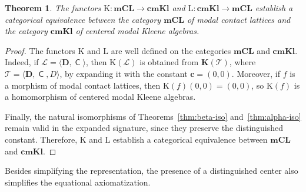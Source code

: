 \documentclass[10pt,a4paper]{amsart}
\newtheorem{theorem}{Theorem}[section]
\DeclareMathOperator{\con}{\mathsf{C}}
\newcommand{\cbf}{\mathbf{c}}
\newcommand{\D}{\mathbf{D}}
\begin{document}
\begin{theorem}
    The functors $\mathrm{K}:\mathbf{mCL}\longrightarrow\mathbf{cmKl}$ and $\mathrm{L}:\mathbf{cmKl}\longrightarrow\mathbf{mCL}$ establish a categorical equivalence between the category $\mathbf{mCL}$ of modal contact lattices and the category $\mathbf{cmKl}$ of centered modal Kleene algebras.
\end{theorem}
\begin{proof}
The functors $\mathrm{K}$ and $\mathrm{L}$ are well defined on the categories
$\mathbf{mCL}$ and $\mathbf{cmKl}$. Indeed, if
$\mathcal{L}=\langle\D,\con\rangle$, then
$\mathrm{K}(\mathcal{L})$ is obtained from
$\mathbf{K}(\mathcal{T})$, where
$\mathcal{T}=\langle\D,\con,D\rangle$, by expanding it with the constant
$\cbf=(0,0)$. Moreover, if $f$ is a morphism of modal contact lattices, then
$\mathrm{K}(f)(0,0)=(0,0)$,
so $\mathrm{K}(f)$ is a homomorphism of centered modal Kleene algebras.

Finally, the natural isomorphisms of
Theorems~\ref{thm:beta-iso} and~\ref{thm:alpha-iso}
remain valid in the expanded signature, since they preserve the distinguished
constant. Therefore, $\mathrm{K}$ and $\mathrm{L}$ establish a categorical
equivalence between $\mathbf{mCL}$ and $\mathbf{cmKl}$.
\end{proof}

Besides simplifying the representation, the presence of a distinguished center also simplifies the equational axiomatization. 
\end{document}
